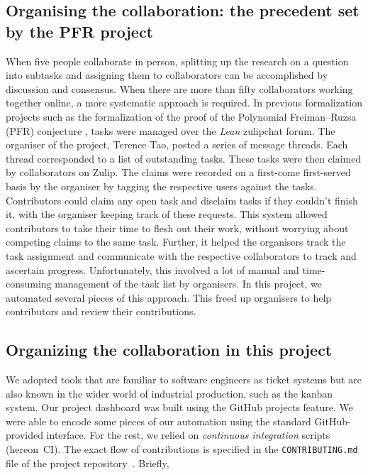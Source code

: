 \documentclass[12pt]{amsart}
\theoremstyle{definition}
\begin{document}
\subsection{Organising the collaboration: the precedent set by the PFR project}
When five people collaborate in person, splitting up the research on a question into subtasks and assigning them to collaborators can be accomplished by discussion and consensus. When there are more than fifty collaborators working together online, a more systematic approach is required. In previous formalization projects such as the formalization of the proof of the Polynomial Freiman--Ruzsa (PFR) conjecture \cite{PFR_Tao_Dilles_2023}, tasks were managed over the \emph{Lean} zulipchat forum. The organiser of the project, Terence Tao, posted a series of message threads. Each thread corresponded to a list of outstanding tasks. These tasks were then claimed by collaborators on Zulip. The claims were recorded on a first-come first-served basis by the organiser by tagging the respective users against the tasks. Contributors could claim any open task and disclaim tasks if they couldn't finish it, with the organiser keeping track of these requests. This system allowed contributors to take their time to flesh out their work, without worrying about competing claims to the same task. Further, it helped the organisers track the task assignment and communicate with the respective collaborators to track and ascertain progress. Unfortunately, this involved a lot of manual and time-consuming management of the task list by organisers. In this project, we automated several pieces of this approach. This freed up organisers to help contributors and review their contributions.

\subsection{Organizing the collaboration in this project}
We adopted tools that are familiar to software engineers as ticket systems but are also known in the wider world of industrial production, such as the kanban system. Our project dashboard was built using the GitHub projects feature. We were able to encode some pieces of our automation using the standard GitHub-provided interface. For the rest, we relied on \emph{continuous integration} scripts (hereon~CI\@). The exact flow of contributions is specified in the \texttt{CONTRIBUTING.md} file of the project repository~\cite{The_Equational_Theories_repository}. Briefly,
\end{document}

